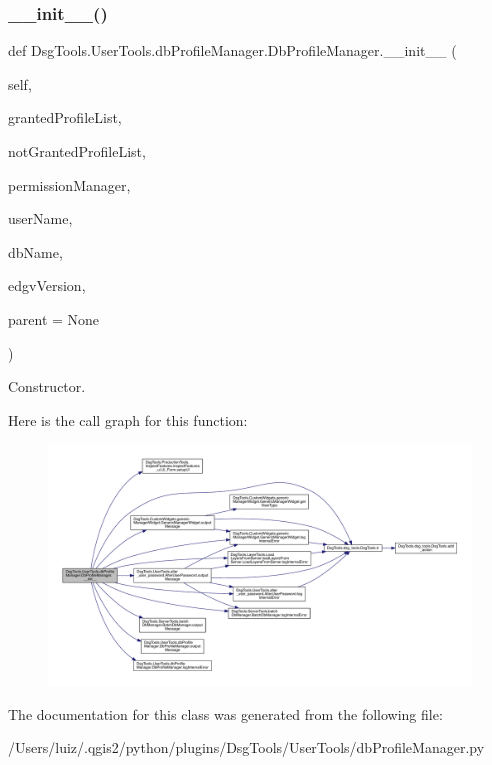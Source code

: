 \subsubsection{\texorpdfstring{\+\_\+\+\_\+init\+\_\+\+\_\+()}{\_\_init\_\_()}}
{\footnotesize\ttfamily def Dsg\+Tools.\+User\+Tools.\+db\+Profile\+Manager.\+Db\+Profile\+Manager.\+\_\+\+\_\+init\+\_\+\+\_\+ (\begin{DoxyParamCaption}\item[{}]{self,  }\item[{}]{granted\+Profile\+List,  }\item[{}]{not\+Granted\+Profile\+List,  }\item[{}]{permission\+Manager,  }\item[{}]{user\+Name,  }\item[{}]{db\+Name,  }\item[{}]{edgv\+Version,  }\item[{}]{parent = {\ttfamily None} }\end{DoxyParamCaption})}

\begin{DoxyVerb}Constructor.\end{DoxyVerb}
 Here is the call graph for this function\+:
\nopagebreak
\begin{figure}[H]
\begin{center}
\leavevmode
\includegraphics[width=350pt]{class_dsg_tools_1_1_user_tools_1_1db_profile_manager_1_1_db_profile_manager_a9b8628b6e71212c42a79c65664116db2_cgraph}
\end{center}
\end{figure}


The documentation for this class was generated from the following file\+:\begin{DoxyCompactItemize}
\item 
/\+Users/luiz/.\+qgis2/python/plugins/\+Dsg\+Tools/\+User\+Tools/db\+Profile\+Manager.\+py\end{DoxyCompactItemize}
